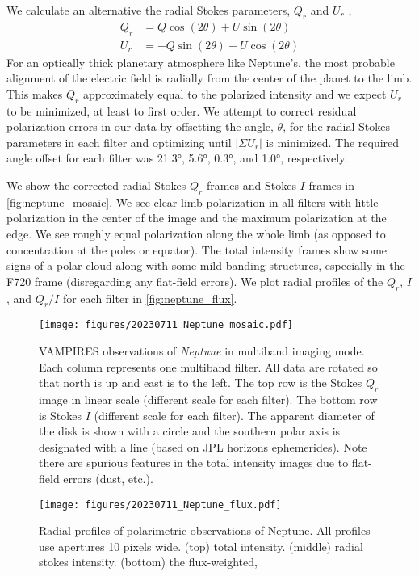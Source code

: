 We calculate an alternative the radial Stokes parameters, $Q_r$ and $U_r$ \citep{schmid_limb_2006},
\begin{align}
    Q_r &= Q\cos{\left(2\theta\right)} + U\sin{\left(2\theta\right)} \\
    U_r &= -Q\sin{\left(2\theta\right)} + U\cos{\left(2\theta\right)}
\end{align}
For an optically thick planetary atmosphere like Neptune's, the most probable alignment of the electric field is radially from the center of the planet to the limb\citep{schmid_limb_2006}. This makes $Q_r$ approximately equal to the polarized intensity and we expect $U_r$ to be minimized, at least to first order. We attempt to correct residual polarization errors in our data by offsetting the angle, $\theta$, for the radial Stokes parameters in each filter and optimizing until $|\Sigma{U_r}|$ is minimized. The required angle offset for each filter was \ang{21.3}, \ang{5.6}, \ang{0.3}, and \ang{1.0}, respectively.

We show the corrected radial Stokes $Q_r$ frames and Stokes $I$ frames in \autoref{fig:neptune_mosaic}. We see clear limb polarization in all filters with little polarization in the center of the image and the maximum polarization at the edge. We see roughly equal polarization along the whole limb (as opposed to concentration at the poles or equator). The total intensity frames show some signs of a polar cloud along with some mild banding structures, especially in the F720 frame (disregarding any flat-field errors). We plot radial profiles of the $Q_r$, $I$, and $Q_r/I$ for each filter in \autoref{fig:neptune_flux}.

\begin{figure*}[t]
    \centering
    \texttt{[image: figures/20230711\_Neptune\_mosaic.pdf]}
    \caption{ VAMPIRES observations of \textit{Neptune} in multiband imaging mode. Each column represents one multiband filter. All data are rotated so that north is up and east is to the left. The top row is the Stokes $Q_r$ image in linear scale (different scale for each filter). The bottom row is Stokes $I$ (different scale for each filter). The apparent diameter of the disk is shown with a circle and the southern polar axis is designated with a line (based on JPL horizons ephemerides). Note there are spurious features in the total intensity images due to flat-field errors (dust, etc.). \label{fig:neptune_mosaic}}
\end{figure*}

\begin{figure}[t]
    \centering
    \texttt{[image: figures/20230711\_Neptune\_flux.pdf]}
    \caption{Radial profiles of polarimetric observations of Neptune. All profiles use apertures 10 pixels wide. (top) total intensity. (middle) radial stokes intensity. (bottom) the flux-weighted, \label{fig:neptune_flux}}
\end{figure}
